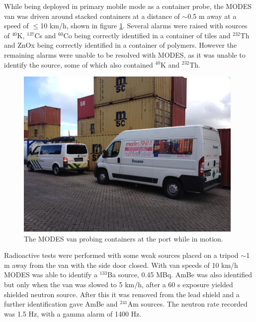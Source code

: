 While being deployed in primary mobile mode as a container probe, the MODES van was driven around stacked containers at a distance of $\sim$0.5 m away at a speed of $\leq$10 km/h, shown in figure \ref{fig:rotterdamContainers2}. Several alarms were raised with sources of $^{40}$K, $^{137}$Cs and $^{60}$Co being correctly identified in a container of tiles and $^{232}$Th and ZnOx being correctly identified in a container of polymers. However the remaining alarms were unable to be resolved with MODES, as it was unable to identify the source, some of which also contained $^{40}$K and $^{232}$Th.

\begin{figure}
\begin{center}
\includegraphics[width=110mm]{./Chapter7/figures/rotterdamContainers2.jpg}
\end{center}
\caption{The MODES van probing containers at the port while in motion.}
\label{fig:rotterdamContainers2}
\end{figure}
 
Radioactive tests were performed with some weak sources placed on a tripod $\sim$1 m away from the van with the side door closed. With van speeds of 10 km/h MODES was able to identify a $^{133}$Ba source, 0.45 MBq. AmBe was also identified but only when the van was slowed to 5 km/h, after a 60 s exposure yielded shielded neutron source. After this it was removed from the lead shield and a further identification gave AmBe and $^{241}$Am sources. The neutron rate recorded was 1.5 Hz, with a gamma alarm of 1400 Hz.
 
